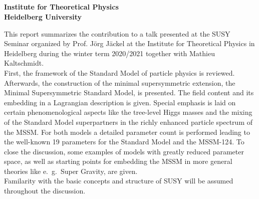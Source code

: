 
\begin{center}
	\makeatletter
	\thispagestyle{plain}
	\LARGE\textbf{\@title} \\
	\vspace{2mm}
	\Large\textbf{\@subtitle} \\
	\vspace{2mm}
	\large\bfseries{\@author} \\
	\normalfont
	\vspace{2mm}
	\large{\@date} \\
	\vspace{2mm}
	\large{Institute for Theoretical Physics \\
		Heidelberg University} \\
	\makeatother
\end{center}

\normalsize
\noindent This report summarizes the contribution to a talk presented at the SUSY Seminar organized by Prof. J\"org J\"ackel at the Institute for Theoretical Physics in Heidelberg during the winter term 2020/2021 together with Mathieu Kaltschmidt.\\
First, the framework of the Standard Model of particle physics is reviewed. Afterwards, the construction of the minimal supersymmetric extension, the Minimal Supersymmetric Standard Model, is presented.
The field content and its embedding in a Lagrangian description is given. Special emphasis is laid on certain phenomenological aspects like the tree-level Higgs masses and the mixing of the Standard Model superpartners in the richly enhanced particle spectrum of the MSSM. For both models a detailed parameter count is performed leading to the well-known 19 parameters for the Standard Model and the MSSM-124.
To close the discussion, some examples of models with greatly reduced parameter space, as well as starting points for embedding the MSSM in more general theories like e.\ g.\ Super Gravity, are given.\\
Familarity with the basic concepts and structure of SUSY will be assumed throughout the discussion.